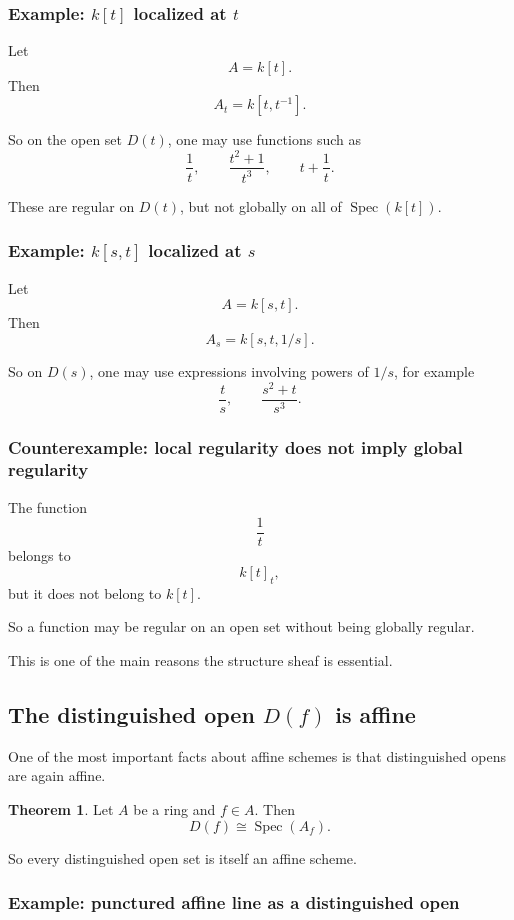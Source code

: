 \documentclass[12pt,a4paper]{article}
\theoremstyle{notespace}
\newcommand{\Spec}{\operatorname{Spec}}
\theoremstyle{definition}
\newtheorem{theorem}[definition]{Theorem}
\begin{document}
\subsubsection{Example: \(k[t]\) localized at \(t\)}

Let
\[
A=k[t].
\]
Then
\[
A_t=k[t,t^{-1}].
\]

So on the open set \(D(t)\), one may use functions such as
\[
\frac{1}{t},\qquad
\frac{t^2+1}{t^3},\qquad
t+\frac{1}{t}.
\]

These are regular on \(D(t)\), but not globally on all of \(\Spec(k[t])\).

\subsubsection{Example: \(k[s,t]\) localized at \(s\)}

Let
\[
A=k[s,t].
\]
Then
\[
A_s=k[s,t,1/s].
\]

So on \(D(s)\), one may use expressions involving powers of \(1/s\), for example
\[
\frac{t}{s},
\qquad
\frac{s^2+t}{s^3}.
\]

\subsubsection{Counterexample: local regularity does not imply global regularity}

The function
\[
\frac{1}{t}
\]
belongs to
\[
k[t]_t,
\]
but it does not belong to \(k[t]\).

So a function may be regular on an open set without being globally regular.

This is one of the main reasons the structure sheaf is essential.

\subsection{The distinguished open \(D(f)\) is affine}

One of the most important facts about affine schemes is that distinguished opens are again affine.

\begin{theorem}
	Let \(A\) be a ring and \(f\in A\). Then
	\[
	D(f)\cong \Spec(A_f).
	\]
\end{theorem}

So every distinguished open set is itself an affine scheme.

\subsubsection{Example: punctured affine line as a distinguished open}
\end{document}
